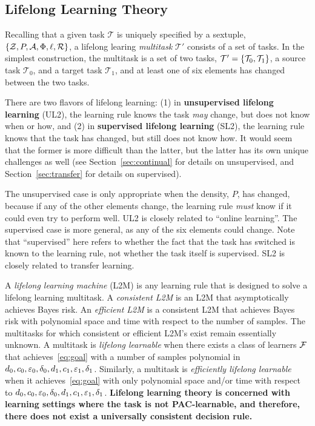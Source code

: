 \documentclass{article}
\begin{document}
\subsection{Lifelong Learning Theory}

Recalling that a given task $\mathcal{T}$ is uniquely specified by a sextuple, $\{\mathcal{Z}, P, \mathcal{A}, \Phi, \ell, \mathcal{R}\}$, a lifelong learing \emph{multitask} $\mathcal{T}'$ consists of a set of tasks.  In the simplest construction, the multitask is a set of two tasks, $\mathcal{T}'=\{\mathcal{T}_0, \mathcal{T}_1\}$,  a source task $\mathcal{T}_0$, and a target task $\mathcal{T}_1$, and at least one of six elements has changed between the two tasks.  


There are two flavors of lifelong learning: (1) in \textbf{unsupervised lifelong learning} (UL2), the learning rule knows the task \emph{may} change, but does not know when or how, and (2) in \textbf{supervised lifelong learning} (SL2), the learning rule knows that the task has changed, but still does not know how.  It would seem that the former is more difficult than the latter, but the latter has its own unique challenges as well (see Section~\ref{sec:continual} for details on unsupervised, and Section~\ref{sec:transfer} for details on supervised).  

The unsupervised case is only appropriate when the density, $P$, has changed, because if any of the other elements change, the learning rule \emph{must} know if it could even try to perform well. UL2 is closely related to ``online learning''.  The supervised case is more general, as any of the six elements could change. Note that ``supervised'' here refers to whether the fact that the task has switched is known to the learning rule, not whether the task itself is supervised.  SL2 is closely related to transfer learning. 



A \emph{lifelong learning machine} (L2M) is any learning rule that is designed to solve a lifelong learning multitask. A \emph{consistent L2M} is an L2M that asymptotically achieves Bayes risk.  An \emph{efficient L2M}  is a consistent L2M that achieves Bayes risk with polynomial space and time with respect to the number of samples. The multitasks for which consistent or efficient L2M's exist remain essentially unknown.
A multitask is \emph{lifelong learnable} when there exists a class of learners $\mathcal{F}$ that achieves~\eqref{eq:goal} with a number of samples polynomial in $d_0,c_0,\varepsilon_0,\delta_0, d_1, c_1, \varepsilon_1, \delta_1$.  Similarly, a multitask is \emph{efficiently lifelong learnable} when it achieves~\eqref{eq:goal} with only polynomial space and/or time with respect to $d_0,c_0,\varepsilon_0,\delta_0, d_1, c_1, \varepsilon_1, \delta_1$.
\textbf{Lifelong learning theory is concerned with learning settings where the task is not PAC-learnable, and therefore, there does not exist a universally consistent decision rule.} 
\end{document}
